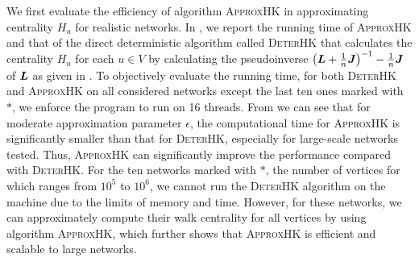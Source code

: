 \documentclass[10pt,twocolumn,twoside]{IEEEtran}
\begin{document}
We first evaluate the efficiency of algorithm \textsc{ApproxHK}  in approximating centrality \(H_u\) for realistic networks.
In , we report the running time of \textsc{ApproxHK} and that of the direct deterministic algorithm called \textsc{DeterHK} that calculates the centrality \(H_u\) for each \(u \in V\) by calculating the pseudoinverse \(\left( \boldsymbol{L} +\frac{1}{n}\boldsymbol{J} \right)^{-1} - \frac{1}{n}\boldsymbol{J}\) of \(\boldsymbol{L}\) as given  in . To objectively evaluate the running time, for both \textsc{DeterHK} and \textsc{ApproxHK} on all considered networks except the last ten ones marked with \(\ast\), we enforce the program to run on 16 threads. From  we can see that for moderate approximation parameter \(\epsilon\), the computational time for \textsc{ApproxHK} is significantly  smaller than  that  for \textsc{DeterHK}, especially for large-scale networks tested.  Thus, \textsc{ApproxHK} can significantly improve the performance compared with \textsc{DeterHK}. For the  ten networks marked with \(\ast\), the number of vertices for which ranges from \(10^5\) to \(10^6\), we cannot run the \textsc{DeterHK} algorithm on the machine due to the limits of memory and time. However, for these networks, we can approximately compute their walk centrality for all vertices by using algorithm \textsc{ApproxHK}, which further shows that \textsc{ApproxHK} is efficient and scalable to large networks.


\end{document}

